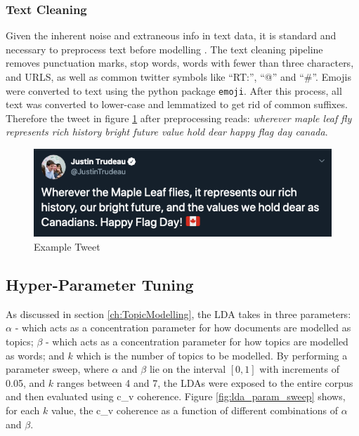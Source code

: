 \subsubsection{Text Cleaning}

Given the inherent noise and extraneous info in text data, it is standard and
necessary to preprocess text before modelling \cite{sapul2017trending}. The text
cleaning pipeline removes punctuation marks, stop words, words with fewer than
three characters, and URLS, as well as common twitter symbols like ``RT:'',
``@'' and ``\#''. Emojis were converted to text using the python package
\texttt{emoji}. After this process, all text was converted to lower-case and
lemmatized to get rid of common suffixes. Therefore the tweet in figure
\ref{fig:tweet_ex} after preprocessing reads: \emph{wherever maple leaf fly
represents rich history bright future value hold dear happy flag day canada}.

\begin{singlespacing}
    \begin{figure}[H]
    \centering
    \includegraphics[scale=0.55]{Figures/tweet_ex}
    \caption[Example Tweet]{Example Tweet}
    \label{fig:tweet_ex}
    \end{figure}
\end{singlespacing}

\subsection{Hyper-Parameter Tuning}\label{sec:TopicModellingHP}

As discussed in section \ref{ch:TopicModelling}, the LDA takes in three
parameters: $\alpha$ - which acts as a concentration parameter for how documents
are modelled as topics; $\beta$ - which acts as a concentration parameter for
how topics are modelled as words; and $k$ which is the number of topics to be
modelled. By performing a parameter sweep, where $\alpha$ and $\beta$ lie on the
interval $\left[0,1\right]$ with increments of 0.05, and $k$ ranges between 4
and 7, the LDAs were exposed to the entire corpus and then evaluated using c\_v
coherence. Figure \ref{fig:lda_param_sweep} shows, for each $k$ value, the c\_v
coherence as a function of different combinations of $\alpha$ and $\beta$.

